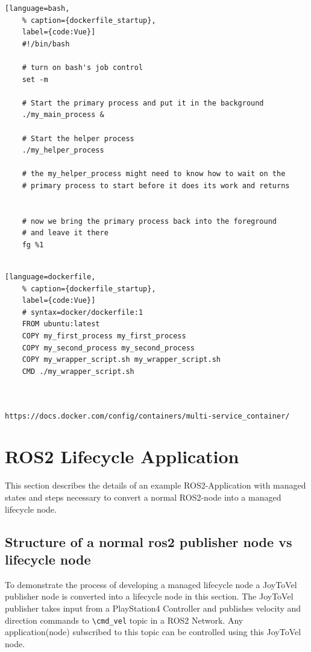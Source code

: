 \begin{lstlisting}[language=bash,
	% caption={dockerfile_startup}, 
	label={code:Vue}]
	#!/bin/bash
  
	# turn on bash's job control
	set -m
	
	# Start the primary process and put it in the background
	./my_main_process &
	
	# Start the helper process
	./my_helper_process
	
	# the my_helper_process might need to know how to wait on the
	# primary process to start before it does its work and returns
	
	
	# now we bring the primary process back into the foreground
	# and leave it there
	fg %1
	
\end{lstlisting}

\begin{lstlisting}[language=dockerfile,
	% caption={dockerfile_startup}, 
	label={code:Vue}]
	# syntax=docker/dockerfile:1
	FROM ubuntu:latest
	COPY my_first_process my_first_process
	COPY my_second_process my_second_process
	COPY my_wrapper_script.sh my_wrapper_script.sh
	CMD ./my_wrapper_script.sh
	
	
\end{lstlisting}

\lstinline{https://docs.docker.com/config/containers/multi-service_container/}

\section{ROS2 Lifecycle Application}
\label{Implementierung:ROS2LifecycleApplication} This section describes the details of an example ROS2-Application with managed states and steps necessary to convert a normal ROS2-node into a managed lifecycle node. 
   

\subsection{Structure of a normal ros2 publisher node vs lifecycle node}
To demonstrate the process of developing a managed lifecycle node a JoyToVel publisher node is converted into a lifecycle node in this section. The JoyToVel publisher takes input from a PlayStation4 Controller and publishes velocity and direction commands to \lstinline{\cmd_vel} topic in a ROS2 Network. Any application(node) subscribed to this topic can be controlled using this JoyToVel node.

